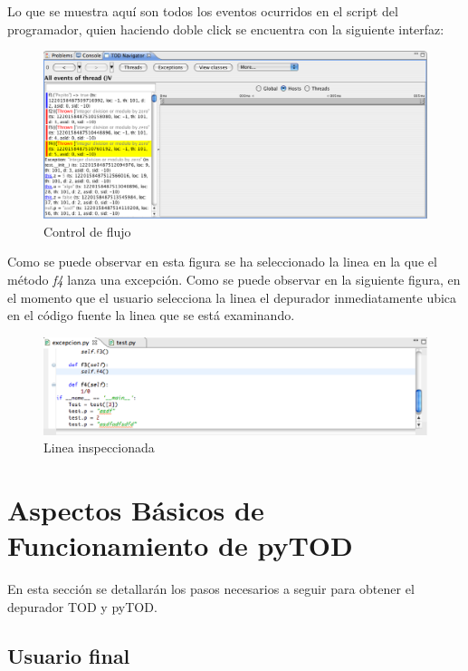 \documentclass[12pt,legalpaper]{report}
\begin{document}
Lo que se muestra aquí son todos los eventos ocurridos en el script del programador, quien haciendo doble click se encuentra con la siguiente interfaz:

\begin{figure}[h]
	\centering
	\includegraphics[scale=0.4]{images/interfacesPlugin/depuracionTOD-3.eps}
	\caption{Control de flujo}
\end{figure}

Como se puede observar en esta figura se ha seleccionado la linea en la que el método \textit{f4} lanza una excepción.  Como se puede observar en la siguiente figura, en el momento que el usuario selecciona la linea el depurador inmediatamente ubica en el código fuente la linea que se está examinando.

 \begin{figure}[h]
	\centering
	\includegraphics[scale=0.4]{images/interfacesPlugin/depuracionTOD-4.eps}
	\caption{Linea inspeccionada}
\end{figure}

	\section{Aspectos Básicos de Funcionamiento de pyTOD}
	
En esta sección se detallarán los pasos necesarios a seguir para obtener el depurador TOD y pyTOD.	
		\subsection{Usuario final}
		
\end{document}
